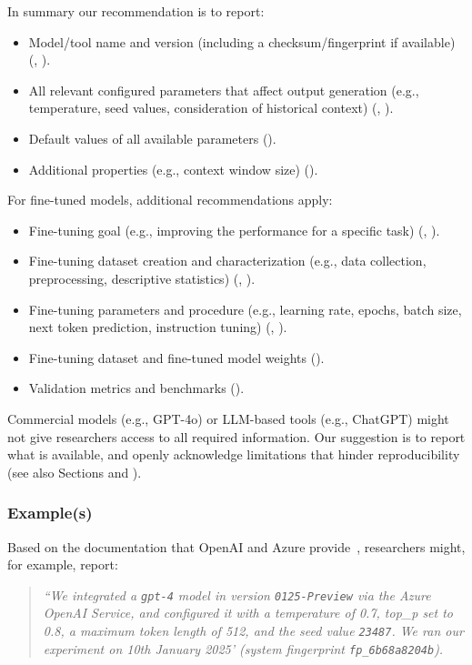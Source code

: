 In summary our recommendation is to report:

\begin{itemize}
\item Model/tool name and version (including a checksum/fingerprint if available) (\must, \paper).
\item All relevant configured parameters that affect output generation (e.g., temperature, seed values, consideration of historical context) (\must, \paper).
\item Default values of all available parameters (\should).
\item Additional properties (e.g., context window size) (\may).
\end{itemize}

For fine-tuned models, additional recommendations apply:

\begin{itemize}
\item Fine-tuning goal (e.g., improving the performance for a specific task) (\must, \paper).
\item Fine-tuning dataset creation and characterization (e.g., data collection, preprocessing, descriptive statistics) (\must, \paper).
\item Fine-tuning parameters and procedure (e.g., learning rate, epochs, batch size, next token prediction, instruction tuning) (\must, \paper).
\item Fine-tuning dataset and fine-tuned model weights (\should).
\item Validation metrics and benchmarks (\should).
\end{itemize}

Commercial models (e.g., GPT-4o) or LLM-based tools (e.g., ChatGPT) might not give researchers access to all required information.
Our suggestion is to report what is available, and openly acknowledge limitations that hinder reproducibility (see also Sections \prompts and \limitationsmitigations).


\subsubsection{Example(s)}

Based on the documentation that OpenAI and Azure provide~\cite{OpenAI25, Azure25}, researchers might, for example, report:

\begin{quote}
\it
 ``We integrated a  \texttt{gpt-4} model in version \texttt{0125-Preview} via the Azure OpenAI Service, and configured it with a temperature of 0.7, top\_p set to 0.8, a maximum token length of 512, and the  seed value \texttt{23487}.
 We ran our experiment on 10th January 2025' (system fingerprint \texttt{fp\_6b68a8204b}).
\end{quote}

